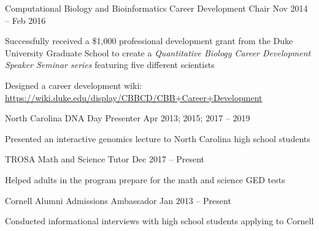 

\begin{resentries}

  \leadershipentry
    {Computational Biology and Bioinformatics Career Development Chair} %
    {Nov 2014 -- Feb 2016} %
     {
		\begin{cvitems} %
			\item{Successfully received a \$1,000 professional development grant from the Duke University Graduate School to create a \textit{Quantitative Biology Career Development Speaker Seminar series} featuring five different scientists}
        	\item{Designed a career development wiki: \href{https://wiki.duke.edu/display/CBBCD/CBB+Career+Development}{\color{blue} https://wiki.duke.edu/display/CBBCD/CBB+Career+Development}}
		\end{cvitems}
	 }

  \leadershipentry
    {North Carolina DNA Day Presenter}
    {Apr 2013; 2015; 2017 -- 2019} %
     {
		\begin{cvitems} %
			\item{Presented an interactive genomics lecture to North Carolina high school students}
		\end{cvitems}
	 }

  \leadershipentry
    {TROSA Math and Science Tutor}
    {Dec 2017 -- Present} %
     {
		\begin{cvitems} %
			\item{Helped adults in the program prepare for the math and science GED tests}
		\end{cvitems}
	 }

  \leadershipentry
    {Cornell Alumni Admissions Ambassador}
    {Jan 2013 -- Present} %
     {
		\begin{cvitems} %
			\item{Conducted informational interviews with high school students applying to Cornell}
		\end{cvitems}
	 }



\end{resentries}
